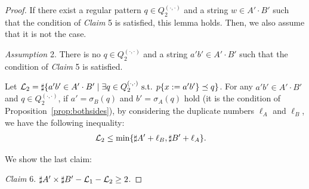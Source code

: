 \begin{proof}
\smallskip

\noindent
If there exist a regular pattern $q \in Q_{2}^{(\cdot,\cdot)}$ and a string $w \in A'\cdot B'$ such that the condition of \textit{Claim} 5 is satisfied, this lemma holds. Then, we also assume that it is not the case.

\smallskip

\noindent
\textit{Assumption} 2.
There is no $q \in Q_{2}^{(\cdot,\cdot)}$ and a string $a'b' \in A'\cdot B'$ such that the condition of \textit{Claim} 5 is satisfied.

\smallskip

\noindent
Let ${\cal L}_{2} = \sharp\{a'b' \in A'\cdot B' \mid \exists q \in Q_{2}^{(\cdot,\cdot)} \mbox{ s.t. } p\{x:=a'b'\} \preceq q\}$.
For any $a'b' \in A'\cdot B'$ and $q \in Q_{2}^{(\cdot,\cdot)}$, if $a' = \sigma_{B}(q)$ and $b' = \sigma_{A}(q)$ hold (it is the condition of Proposition~\ref{prop:bothsides}), by considering the duplicate numbers $\ell_{A}$ and $\ell_{B}$, we have the following inequality:
\begin{align*}
  {\cal L}_{2} &\leq \min\{\sharp A' + \ell_{B}, \sharp B' + \ell_{A}\}.
\end{align*}

We show the last claim:
  
\smallskip

\noindent
\textit{Claim} 6. 
$\sharp A' \times \sharp B' - {\cal L}_{1} - {\cal L}_{2} \geq 2$.

\smallskip


\end{proof}
